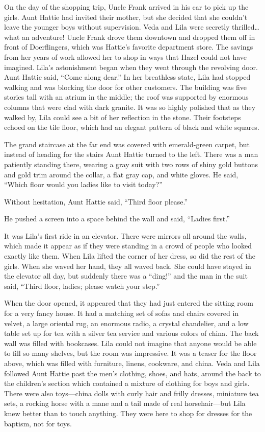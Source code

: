 \documentclass[
  letterpaper,
]{book}
\begin{document}
On the day of the shopping trip, Uncle Frank arrived in his car to pick
up the girls. Aunt Hattie had invited their mother, but she decided that
she couldn't leave the younger boys without supervision. Veda and Lila
were secretly thrilled\ldots what an adventure! Uncle Frank drove them
downtown and dropped them off in front of Doerflingers, which was
Hattie's favorite department store. The savings from her years of work
allowed her to shop in ways that Hazel could not have imagined. Lila's
astonishment began when they went through the revolving door. Aunt
Hattie said, ``Come along dear.'' In her breathless state, Lila had
stopped walking and was blocking the door for other customers. The
building was five stories tall with an atrium in the middle; the roof
was supported by enormous columns that were clad with dark granite. It
was so highly polished that as they walked by, Lila could see a bit of
her reflection in the stone. Their footsteps echoed on the tile floor,
which had an elegant pattern of black and white squares.

The grand staircase at the far end was covered with emerald-green
carpet, but instead of heading for the stairs Aunt Hattie turned to the
left. There was a man patiently standing there, wearing a gray suit with
two rows of shiny gold buttons and gold trim around the collar, a flat
gray cap, and white gloves. He said, ``Which floor would you ladies like
to visit today?''

Without hesitation, Aunt Hattie said, ``Third floor please.''

He pushed a screen into a space behind the wall and said, ``Ladies
first.''

It was Lila's first ride in an elevator. There were mirrors all around
the walls, which made it appear as if they were standing in a crowd of
people who looked exactly like them. When Lila lifted the corner of her
dress, so did the rest of the girls. When she waved her hand, they all
waved back. She could have stayed in the elevator all day, but suddenly
there was a ``ding!'' and the man in the suit said, ``Third floor,
ladies; please watch your step.''

When the door opened, it appeared that they had just entered the sitting
room for a very fancy house. It had a matching set of sofas and chairs
covered in velvet, a large oriental rug, an enormous radio, a crystal
chandelier, and a low table set up for tea with a silver tea service and
various colors of china. The back wall was filled with bookcases. Lila
could not imagine that anyone would be able to fill so many shelves, but
the room was impressive. It was a teaser for the floor above, which was
filled with furniture, linens, cookware, and china. Veda and Lila
followed Aunt Hattie past the men's clothing, shoes, and hats, around
the back to the children's section which contained a mixture of clothing
for boys and girls. There were also toys---china dolls with curly hair
and frilly dresses, miniature tea sets, a rocking horse with a mane and
a tail made of real horsehair---but Lila knew better than to touch
anything. They were here to shop for dresses for the baptism, not for
toys.
\end{document}
